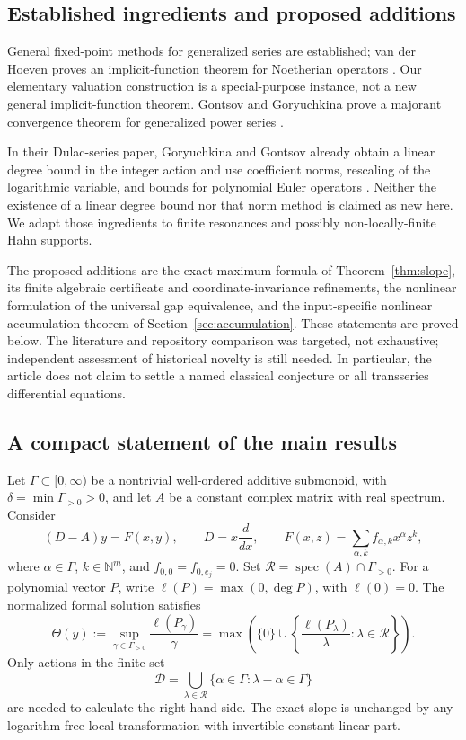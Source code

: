 \documentclass[11pt,a4paper]{article}
\numberwithin{equation}{section}
\theoremstyle{definition}
\theoremstyle{remark}
\newcommand{\NN}{\mathbb N}
\newcommand{\G}{\Gamma}
\newcommand{\Reson}{\mathcal R}
\newcommand{\spec}{\operatorname{spec}}
\begin{document}
\subsection{Established ingredients and proposed additions}
General fixed-point methods for generalized series are established;
van der Hoeven proves an implicit-function theorem for Noetherian
operators \cite{vdh}. Our elementary valuation construction is a
special-purpose instance, not a new general implicit-function theorem.
Gontsov and Goryuchkina prove a majorant convergence theorem for
generalized power series \cite{gg-generalized}.

In their Dulac-series paper, Goryuchkina and Gontsov already obtain a
linear degree bound in the integer action and use coefficient norms,
rescaling of the logarithmic variable, and bounds for polynomial Euler
operators \cite[Lemmas 2--3]{gg-dulac}. Neither the existence of a linear
degree bound nor that norm method is claimed as new here. We adapt those
ingredients to finite resonances and possibly non-locally-finite Hahn
supports.

The proposed additions are the exact maximum formula of
Theorem~\ref{thm:slope}, its finite algebraic certificate and
coordinate-invariance refinements, the nonlinear formulation of the
universal gap equivalence, and the input-specific nonlinear accumulation
theorem of Section~\ref{sec:accumulation}. These statements are proved
below. The literature and repository comparison was targeted, not
exhaustive; independent assessment of historical novelty is still
needed. In particular, the article does not claim to settle a named
classical conjecture or all transseries differential equations.

\subsection{A compact statement of the main results}
Let \(\G\subset[0,\infty)\) be a nontrivial well-ordered additive
submonoid, with \(\delta=\min\G_{>0}>0\), and let \(A\) be a constant
complex matrix with real spectrum. Consider
\begin{equation}\label{eq:model-intro}
 (D-A)y=F(x,y),\qquad D=x\frac{d}{dx},\qquad
 F(x,z)=\sum_{\alpha,k}f_{\alpha,k}x^\alpha z^k,
\end{equation}
where \(\alpha\in\G\), \(k\in\NN^m\), and
\(f_{0,0}=f_{0,e_j}=0\). Set
\(\Reson=\spec(A)\cap\G_{>0}\).
For a polynomial vector \(P\), write \(\ell(P)=\max(0,\deg P)\),
with \(\ell(0)=0\). The normalized formal solution satisfies
\begin{equation}\label{eq:main-slope-intro}
 \Theta(y):=\sup_{\gamma\in\G_{>0}}
      \frac{\ell(P_\gamma)}{\gamma}
 =\max\left(\{0\}\cup
      \left\{\frac{\ell(P_\lambda)}{\lambda}:\lambda\in\Reson\right\}\right).
\end{equation}
Only actions in the finite set
\begin{equation}\label{eq:certificate-intro}
 \mathcal D=
 \bigcup_{\lambda\in\Reson}
 \{\alpha\in\G:\lambda-\alpha\in\G\}
\end{equation}
are needed to calculate the right-hand side. The exact slope is unchanged
by any logarithm-free local transformation with invertible constant
linear part.
\end{document}
